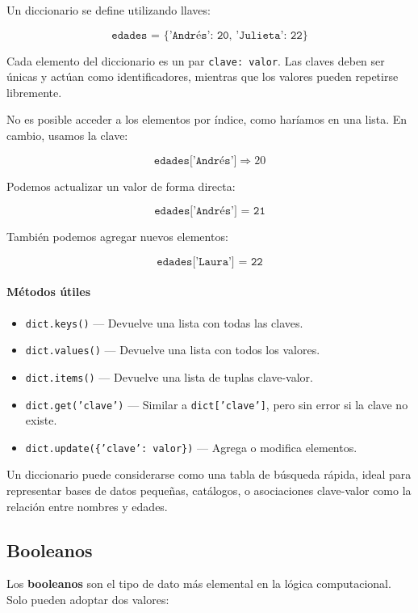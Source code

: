 \documentclass{article}
\theoremstyle{nonumberplain}
\begin{document}
Un diccionario se define utilizando llaves:

\[
\texttt{edades = \{'Andrés': 20, 'Julieta': 22\}}
\]

Cada elemento del diccionario es un par \texttt{clave: valor}. Las claves deben ser únicas y actúan como identificadores, mientras que los valores pueden repetirse libremente.

No es posible acceder a los elementos por índice, como haríamos en una lista. En cambio, usamos la clave:

\[
\texttt{edades['Andrés']} \Rightarrow 20
\]

Podemos actualizar un valor de forma directa:

\[
\texttt{edades['Andrés'] = 21}
\]

También podemos agregar nuevos elementos:

\[
\texttt{edades['Laura'] = 22}
\]

\paragraph{Métodos útiles}

\begin{itemize}
    \item \texttt{dict.keys()} — Devuelve una lista con todas las claves.
    \item \texttt{dict.values()} — Devuelve una lista con todos los valores.
    \item \texttt{dict.items()} — Devuelve una lista de tuplas clave-valor.
    \item \texttt{dict.get('clave')} — Similar a \texttt{dict['clave']}, pero sin error si la clave no existe.
    \item \texttt{dict.update(\{'clave': valor\})} — Agrega o modifica elementos.
\end{itemize}

Un diccionario puede considerarse como una tabla de búsqueda rápida, ideal para representar bases de datos pequeñas, catálogos, o asociaciones clave-valor como la relación entre nombres y edades.



\subsection*{Booleanos}

Los \textbf{booleanos} son el tipo de dato más elemental en la lógica computacional. Solo pueden adoptar dos valores:
\end{document}
